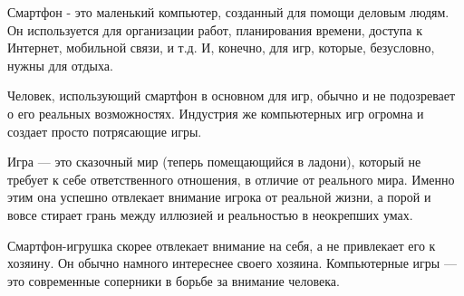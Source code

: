 Смартфон - это маленький компьютер, созданный для помощи деловым людям. Он используется для организации работ, планирования времени, доступа к Интернет, мобильной связи, и т.д. И, конечно, для игр, которые, безусловно, нужны для отдыха.

Человек, использующий смартфон в основном для игр, обычно и не подозревает о его реальных возможностях. Индустрия же компьютерных игр огромна и создает просто потрясающие игры.

Игра --- это сказочный мир (теперь помещающийся в ладони), который не требует к себе ответственного отношения, в отличие от реального мира. Именно этим она успешно отвлекает внимание игрока от реальной жизни, а порой и вовсе стирает грань между иллюзией и реальностью в неокрепших умах.

Смартфон-игрушка скорее отвлекает внимание на себя, а не привлекает его к хозяину. Он обычно намного интереснее своего хозяина. Компьютерные игры --- это современные соперники в борьбе за внимание человека.

